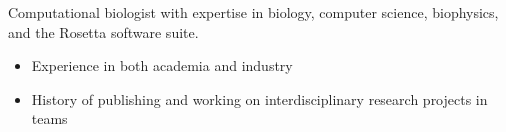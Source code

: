 
Computational biologist with expertise in biology, computer science, biophysics, and the Rosetta software suite.
\begin{itemize}
\item Experience in both academia and industry
\item History of publishing and working on interdisciplinary research projects in teams
\end{itemize}
